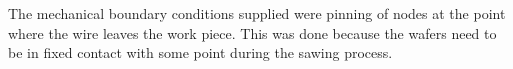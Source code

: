 The mechanical boundary conditions supplied were pinning of nodes at the point where the wire leaves the work piece. This was done because the wafers need to be in fixed contact with some point during the sawing process. 


